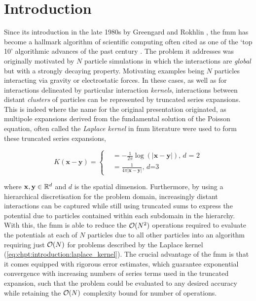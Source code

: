 
\chapter{Introduction}\label{chpt:introduction}
\thispagestyle{chaptertitle} %
Since its introduction in the late 1980s by Greengard and Rokhlin \cite{greengard1987fast}, the \acrfull{fmm} has become a hallmark algorithm of scientific computing often cited as one of the `top 10' algorithmic advances of the past century \cite{cipra2000best}. The problem it addresses was originally motivated by $N$ particle simulations in which the interactions are \textit{global} but with a strongly decaying property. Motivating examples being $N$ particles interacting via gravity or electrostatic forces. In these cases, as well as for interactions delineated by particular interaction \textit{kernels}, interactions between distant \textit{clusters} of particles can be represented by truncated series expansions. This is indeed where the name for the original presentation originated, as multipole expansions derived from the fundamental solution of the Poisson equation, often called the \textit{Laplace kernel} in \acrshort{fmm} literature were used to form these truncated series expansions,


\begin{equation}
    K(\mathbf{x-y}) =  \begin{cases}
        &= -\frac{1}{2\pi} \log(|\mathbf{x-y}|) \text{, $d$ = 2} \\
        &= \frac{1}{4\pi | \mathbf{x-y}|} \text{, $d$=3 }
    \end{cases}
    \label{eq:chpt:introduction:laplace_kernel}
\end{equation}


where $\mathbf{x}, \mathbf{y} \in \mathbb{R}^d$ and $d$ is the spatial dimension. Furthermore, by using a hierarchical discretisation for the problem domain, increasingly distant interactions can be captured while still using truncated sums to express the potential due to particles contained within each subdomain in the hierarchy. With this, the \acrshort{fmm} is able to reduce the $\mathcal{O}(N^2)$ operations required to evaluate the potentials at each of $N$ particles due to all other particles into an algorithm requiring just $\mathcal{O}(N)$ for problems described by the Laplace kernel (\ref{eq:chpt:introduction:laplace_kernel}). The crucial advantage of the \acrshort{fmm} is that it comes equipped with rigorous error estimates, which guarantee exponential convergence with increasing numbers of series terms used in the truncated expansion, such that the problem could be evaluated to any desired accuracy while retaining the $\mathcal{O}(N)$ complexity bound for number of operations.

